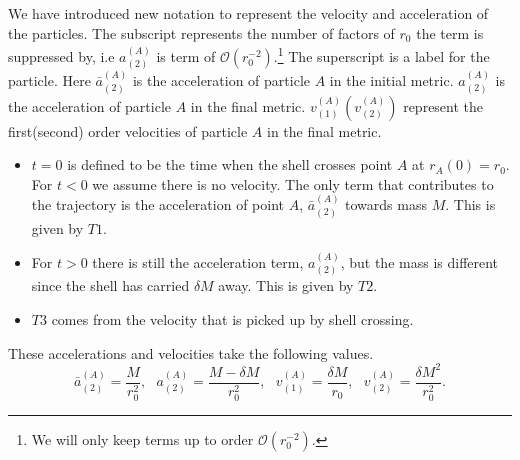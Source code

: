 \documentclass[aps,showpacs,onecolumn,floats,prd,superscriptaddress,nofootinbib]{revtex4-1}
\begin{document}
We have introduced new notation to represent the velocity and acceleration of the particles. The subscript represents the number of factors of $r_0$ the term is suppressed by, i.e $a^{(A)}_{(2)}$ is term of $\mathcal{O}(r_0^{-2})$.\footnote{We will only keep terms up to order $\mathcal{O}(r_0^{-2})$.} The superscript is a label for the particle. Here $\bar{a}^{(A)}_{(2)}$ is the acceleration of particle $A$ in the initial metric. $a^{(A)}_{(2)}$ is the acceleration of particle $A$ in the final metric. $v^{(A)}_{(1)}(v^{(A)}_{(2)})$ represent the first(second) order velocities of particle $A$ in the final metric. 
\begin{itemize}
\item $t=0$ is defined to be the time when the shell crosses point $A$ at $r_A(0) = r_0$. For $t<0$ we assume there is no velocity. The only term that contributes to the trajectory is the acceleration of point $A$, $\bar{a}^{(A)}_{(2)}$ towards mass $M$. This is given by $T1$.
\item For $t>0$ there is still the acceleration term, $a^{(A)}_{(2)}$, but the mass is different since the shell has carried $\delta M$ away. This is given by $T2$.
\item $T3$ comes from the velocity that is picked up by shell crossing. 
\end{itemize}
These accelerations and velocities take the following values.
\begin{equation}
	\bar{a}^{(A)}_{(2)} = \frac{M}{r_0^2}, \ \ \ 
	a^{(A)}_{(2)} = \frac{M - \delta M}{r_0^2}, \ \ \ 
	v^{(A)}_{(1)} = \frac{\delta M}{r_0}, \ \ \ 
	v^{(A)}_{(2)} = \frac{\delta M^2}{r_0^2}.
\end{equation} 
\end{document}
